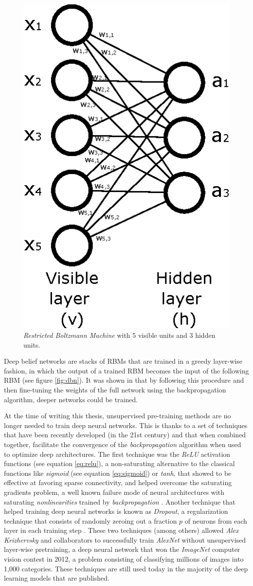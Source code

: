 \begin{figure}
	\centering
	\includegraphics[width=0.4\linewidth]{chapter2/images/rbm}
	\caption{\textit{Restricted Boltzmann Machine} with 5 visible units and 3 hidden units.}
	\label{fig:rbm}
\end{figure}

Deep belief networks are stacks of RBMs that are trained in a greedy layer-wise fashion, in which the output of a trained RBM becomes the input of the following RBM \autocite{hinton2006} (see figure \ref{fig:dbn}). It was shown in \autocite{Bengio2007} that by following this procedure and then fine-tuning the weights of the full network using the backpropagation algorithm, deeper networks could be trained.


At the time of writing this thesis, unsupervised pre-training methods are no longer needed to train deep neural networks. This is thanks to a set of techniques that have been recently developed (in the 21st century) and that when combined together, facilitate the convergence of the \textit{backpropagation} algorithm when used to optimize deep architectures. The first technique was the \textit{ReLU} activation functions \autocite{nair2010} (see equation \ref{eq:relu}), a non-saturating alternative to the classical functions like \textit{sigmoid} (see equation \ref{eq:sigmoid}) or \textit{tanh}, that showed to be effective at favoring sparse connectivity, and helped overcome the saturating gradients problem, a well known failure mode of neural architectures with saturating \textit{nonlinearities} trained by \textit{backpropagation} \autocite{Hong2019}. Another technique that helped training deep neural networks is known as \textit{Dropout}, a regularization technique that consists of randomly zeroing out a fraction $p$ of neurons from each layer in each training step \autocite{hinton2012, srivastava2014}. These two techniques (among others) allowed \textit{Alex Krizhervsky} and collaborators to successfully train \textit{AlexNet} \autocite{krizhevsky2012} without unsupervised layer-wise pretraining, a deep neural network that won the \textit{ImageNet} \autocite{deng2009imagenet} computer vision contest in 2012, a problem consisting of classifying millions of images into 1,000 categories. These techniques are still used today in the majority of the deep learning models that are published.

